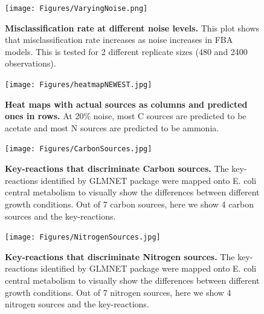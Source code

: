 \documentclass[12pt]{article}
\begin{document}
\begin{figure}[!ht]
\begin{center}
\texttt{[image: Figures/VaryingNoise.png]}
\end{center}
\caption{
{\bf Misclassification rate at different noise levels.} This plot shows that misclassification rate increases as noise increases in FBA models. This is tested for 2 different replicate sizes (480 and 2400 observations). 
}
\label{Figure_label}
\end{figure}

\begin{figure}[!ht]
\begin{center}
\texttt{[image: Figures/heatmapNEWEST.jpg]}
\end{center}
\caption{
{\bf Heat maps with actual sources as columns and predicted ones in rows.}  At 20\% noise, most C sources are predicted to be acetate and most N sources are predicted to be ammonia.
}
\label{Figure_label}
\end{figure}

\begin{figure}[!ht]
\begin{center}
\hspace*{-3.5cm}
\texttt{[image: Figures/CarbonSources.jpg]}
\end{center}
\caption{
{\bf Key-reactions that discriminate Carbon sources.}  The key-reactions identified by GLMNET package were mapped onto E. coli central metabolism to visually show the differences between different growth conditions. Out of 7 carbon sources, here we show 4 carbon sources and the key-reactions.
}
\label{Figure_label}
\end{figure}

\begin{figure}[!ht]
\begin{center}
\hspace*{-3.25cm}
\texttt{[image: Figures/NitrogenSources.jpg]}
\end{center}
\caption{
{\bf Key-reactions that discriminate Nitrogen sources.}  The key-reactions identified by GLMNET package were mapped onto E. coli central metabolism to visually show the differences between different growth conditions. Out of 7 nitrogen sources, here we show 4 nitrogen sources and the key-reactions.
}
\label{Figure_label}
\end{figure}

\end{document}

